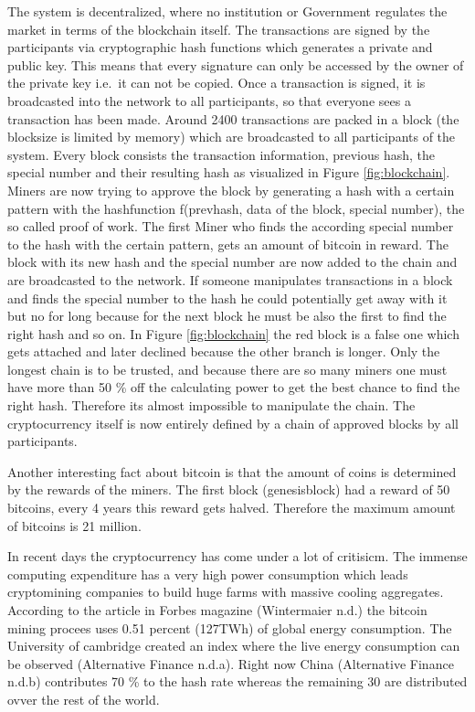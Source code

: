 \documentclass[
]{article}
\begin{document}
The system is decentralized, where no institution or Government
regulates the market in terms of the blockchain itself. The transactions
are signed by the participants via cryptographic hash functions which
generates a private and public key. This means that every signature can
only be accessed by the owner of the private key i.e.~it can not be
copied. Once a transaction is signed, it is broadcasted into the network
to all participants, so that everyone sees a transaction has been made.
Around 2400 transactions are packed in a block (the blocksize is limited
by memory) which are broadcasted to all participants of the system.
Every block consists the transaction information, previous hash, the
special number and their resulting hash as visualized in Figure
\ref{fig:blockchain}. Miners are now trying to approve the block by
generating a hash with a certain pattern with the hashfunction
f(prevhash, data of the block, special number), the so called proof of
work. The first Miner who finds the according special number to the hash
with the certain pattern, gets an amount of bitcoin in reward. The block
with its new hash and the special number are now added to the chain and
are broadcasted to the network. If someone manipulates transactions in a
block and finds the special number to the hash he could potentially get
away with it but no for long because for the next block he must be also
the first to find the right hash and so on. In Figure
\ref{fig:blockchain} the red block is a false one which gets attached
and later declined because the other branch is longer. Only the longest
chain is to be trusted, and because there are so many miners one must
have more than 50 \% off the calculating power to get the best chance to
find the right hash. Therefore its almost impossible to manipulate the
chain. The cryptocurrency itself is now entirely defined by a chain of
approved blocks by all participants.

Another interesting fact about bitcoin is that the amount of coins is
determined by the rewards of the miners. The first block (genesisblock)
had a reward of 50 bitcoins, every 4 years this reward gets halved.
Therefore the maximum amount of bitcoins is 21 million.

In recent days the cryptocurrency has come under a lot of critisicm. The
immense computing expenditure has a very high power consumption which
leads cryptomining companies to build huge farms with massive cooling
aggregates. According to the article in Forbes magazine (Wintermaier
n.d.) the bitcoin mining procees uses 0.51 percent (127TWh) of global
energy consumption. The University of cambridge created an index where
the live energy consumption can be observed (Alternative Finance n.d.a).
Right now China (Alternative Finance n.d.b) contributes 70 \% to the
hash rate whereas the remaining 30 are distributed ovver the rest of the
world.
\end{document}
